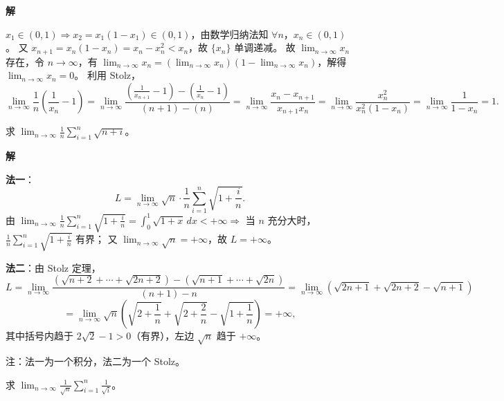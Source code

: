 \documentclass[lang=cn,chinesefont=founder,10pt]{elegantbook}
\renewenvironment{proof}[1][\proofname]{
  \par\noindent\textbf{\color{second}#1\;}\par\noindent
  \color{black!90}\cfs}{
  \par}
\begin{document}
\begin{proof}[解]
    $x_1 \in (0,1) \Rightarrow x_2 = x_1(1-x_1) \in (0,1)$，由数学归纳法知 $\forall n$，$x_n \in (0,1)$。
    又 $x_{n+1} = x_n(1-x_n) = x_n - x_n^2 < x_n$，故 $\{x_n\}$ 单调递减。
    故 $\lim_{n \to \infty} x_n$ 存在，令 $n \to \infty$，有 $\lim_{n \to \infty} x_n = \left(\lim_{n \to \infty} x_n\right)\left(1 - \lim_{n \to \infty} x_n\right)$，解得 $\lim_{n \to \infty} x_n = 0$。
    利用 Stolz，
    \[
        \lim_{n \to \infty} \frac{1}{n}\left(\frac{1}{x_n} - 1\right)
        = \lim_{n \to \infty} \frac{\left(\frac{1}{x_{n+1}} - 1\right) - \left(\frac{1}{x_n} - 1\right)}{(n+1) - (n)}
        = \lim_{n \to \infty} \frac{x_n - x_{n+1}}{x_{n+1}x_n}
        = \lim_{n \to \infty} \frac{x_n^2}{x_n^2(1-x_n)}
        = \lim_{n \to \infty} \frac{1}{1-x_n}
        = 1.
    \]
\end{proof}

\begin{example}
    求 $\displaystyle\lim_{n \to \infty} \frac{1}{n}\sum_{i=1}^{n}\sqrt{n+i}$。
\end{example}

\begin{proof}[解]
    \textbf{法一}：
    \[
        L = \lim_{n \to \infty} \sqrt{n}\cdot\frac{1}{n}\sum_{i=1}^{n}\sqrt{1+\frac{i}{n}}.
    \]
    由 $\displaystyle\lim_{n \to \infty} \frac{1}{n}\sum_{i=1}^{n}\sqrt{1+\frac{i}{n}} = \int_0^1 \sqrt{1+x}\,dx < +\infty \Rightarrow$ 当 $n$ 充分大时，$\frac{1}{n}\sum_{i=1}^{n}\sqrt{1+\frac{i}{n}}$ 有界；
    又 $\lim_{n \to \infty} \sqrt{n} = +\infty$，故 $L = +\infty$。

    \textbf{法二}：由 Stolz 定理，
    \[
        L = \lim_{n \to \infty} \frac{\left(\sqrt{n+2} + \cdots + \sqrt{2n+2}\right) - \left(\sqrt{n+1} + \cdots + \sqrt{2n}\right)}{(n+1) - n}
        = \lim_{n \to \infty} \left(\sqrt{2n+1} + \sqrt{2n+2} - \sqrt{n+1}\right)
    \]
    \[
        = \lim_{n \to \infty} \sqrt{n}\left(\sqrt{2+\frac{1}{n}} + \sqrt{2+\frac{2}{n}} - \sqrt{1+\frac{1}{n}}\right) = +\infty,
    \]
    其中括号内趋于 $2\sqrt{2}-1 > 0$（有界），左边 $\sqrt{n}$ 趋于 $+\infty$。
\end{proof}

\begin{remark}
    注：法一为一个积分，法二为一个 Stolz。
\end{remark}

\begin{example}
    求 $\displaystyle\lim_{n \to \infty} \frac{1}{\sqrt{n}}\sum_{i=1}^{n}\frac{1}{\sqrt{i}}$。
\end{example}
\end{document}
